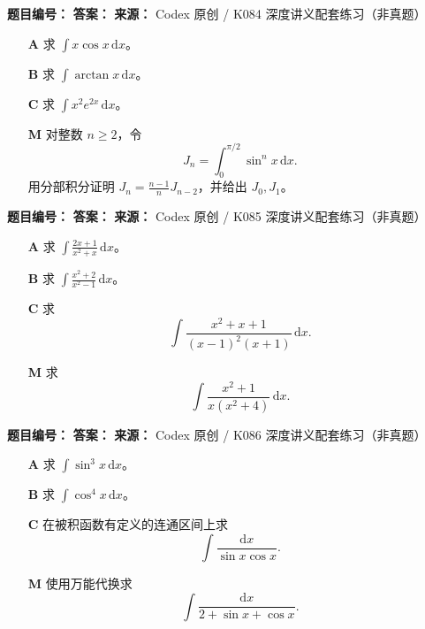 \begin{problemBox}
\begin{problemMeta}
\textbf{题目编号：} \quad
\textbf{答案：} \quad
\textbf{来源：} Codex 原创 / K084 深度讲义配套练习（非真题）
\end{problemMeta}
\begin{enumerate}
  \item[\textbf{A}] 求 \(\displaystyle\int x\cos x\,\mathrm dx\)。
  \item[\textbf{B}] 求 \(\displaystyle\int\arctan x\,\mathrm dx\)。
  \item[\textbf{C}] 求 \(\displaystyle\int x^2e^{2x}\,\mathrm dx\)。
  \item[\textbf{M}] 对整数 \(n\ge2\)，令
  \[
  J_n=\int_0^{\pi/2}\sin^n x\,\mathrm dx.
  \]
  用分部积分证明
  \(J_n=\frac{n-1}{n}J_{n-2}\)，并给出 \(J_0,J_1\)。
\end{enumerate}
\end{problemBox}

\begin{problemBox}
\begin{problemMeta}
\textbf{题目编号：} \quad
\textbf{答案：} \quad
\textbf{来源：} Codex 原创 / K085 深度讲义配套练习（非真题）
\end{problemMeta}
\begin{enumerate}
  \item[\textbf{A}] 求
  \(\displaystyle\int\frac{2x+1}{x^2+x}\,\mathrm dx\)。
  \item[\textbf{B}] 求
  \(\displaystyle\int\frac{x^2+2}{x^2-1}\,\mathrm dx\)。
  \item[\textbf{C}] 求
  \[
  \int\frac{x^2+x+1}{(x-1)^2(x+1)}\,\mathrm dx.
  \]
  \item[\textbf{M}] 求
  \[
  \int\frac{x^2+1}{x(x^2+4)}\,\mathrm dx.
  \]
\end{enumerate}
\end{problemBox}

\begin{problemBox}
\begin{problemMeta}
\textbf{题目编号：} \quad
\textbf{答案：} \quad
\textbf{来源：} Codex 原创 / K086 深度讲义配套练习（非真题）
\end{problemMeta}
\begin{enumerate}
  \item[\textbf{A}] 求 \(\displaystyle\int\sin^3x\,\mathrm dx\)。
  \item[\textbf{B}] 求 \(\displaystyle\int\cos^4x\,\mathrm dx\)。
  \item[\textbf{C}] 在被积函数有定义的连通区间上求
  \[
  \int\frac{\mathrm dx}{\sin x\cos x}.
  \]
  \item[\textbf{M}] 使用万能代换求
  \[
  \int\frac{\mathrm dx}{2+\sin x+\cos x}.
  \]
\end{enumerate}
\end{problemBox}

